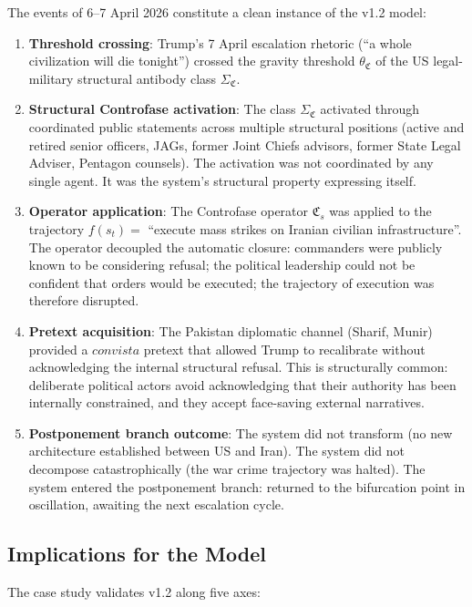 \documentclass[12pt,a4paper]{article}
\newcommand{\CFs}{\mathfrak{C}_s}        %
\newcommand{\SigmaCF}{\Sigma_{\mathfrak{C}}}  %
\newcommand{\thetaCF}{\theta_{\mathfrak{C}}}   %
\begin{document}
The events of 6--7 April 2026 constitute a clean instance of the v1.2 model:

\begin{enumerate}[leftmargin=2em]
    \item \textbf{Threshold crossing}: Trump's 7 April escalation rhetoric (``a whole civilization will die tonight'') crossed the gravity threshold $\thetaCF$ of the US legal-military structural antibody class $\SigmaCF$.
    \item \textbf{Structural Controfase activation}: The class $\SigmaCF$ activated through coordinated public statements across multiple structural positions (active and retired senior officers, JAGs, former Joint Chiefs advisors, former State Legal Adviser, Pentagon counsels). The activation was not coordinated by any single agent. It was the system's structural property expressing itself.
    \item \textbf{Operator application}: The Controfase operator $\CFs$ was applied to the trajectory $f(s_t) = $ ``execute mass strikes on Iranian civilian infrastructure''. The operator decoupled the automatic closure: commanders were publicly known to be considering refusal; the political leadership could not be confident that orders would be executed; the trajectory of execution was therefore disrupted.
    \item \textbf{Pretext acquisition}: The Pakistan diplomatic channel (Sharif, Munir) provided a $con vista$ pretext that allowed Trump to recalibrate without acknowledging the internal structural refusal. This is structurally common: deliberate political actors avoid acknowledging that their authority has been internally constrained, and they accept face-saving external narratives.
    \item \textbf{Postponement branch outcome}: The system did not transform (no new architecture established between US and Iran). The system did not decompose catastrophically (the war crime trajectory was halted). The system entered the postponement branch: returned to the bifurcation point in oscillation, awaiting the next escalation cycle.
\end{enumerate}

\subsection{Implications for the Model}

The case study validates v1.2 along five axes:
\end{document}
